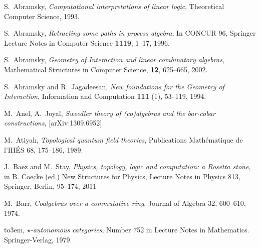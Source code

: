 \documentclass[english,letter paper,12pt,reqno]{article}
\theoremstyle{example}
\numberwithin{equation}{section}
\begin{document}


\providecommand{\bysame}{\leavevmode\hbox to3em{\hrulefill}\thinspace}
\providecommand{\href}[2]{#2}
\begin{thebibliography}{BHLS03}

S.~Abramsky, \textsl{Computational interpretations of linear logic}, Theoretical Computer Science, 1993.

S.~Abramsky, \textsl{Retracting some paths in process algebra}, In CONCUR 96, Springer Lecture Notes in Computer Science \textbf{1119}, 1--17, 1996.

S.~Abramsky, \textsl{Geometry of {I}nteraction and linear combinatory algebras}, Mathematical Structures in Computer Science, \textbf{12}, 625--665, 2002.

S.~Abramsky and R.~Jagadeesan, \textsl{New foundations for the {G}eometry of {I}nteraction}, Information and Computation \textbf{111} (1), 53--119, 1994.

M.~Anel, A.~Joyal, \textsl{Sweedler theory of (co)algebras and the bar-cobar constructions}, \href{http://arxiv.org/abs/1309.6952}{[arXiv:1309.6952]}

M.~Atiyah, \textsl{Topological quantum field theories}, Publications Math\'{e}matique de l'IH\'{E}S 68, 175--186, 1989.

J.~Baez and M.~Stay, \textsl{Physics, topology, logic and computation: a Rosetta stone}, in B. Coecke (ed.) New Structures for Physics, Lecture Notes in Physics 813, Springer, Berlin, 95--174, 2011

M.~Barr, \textsl{Coalgebras over a commutative ring}, Journal of Algebra 32, 600--610, 1974.

\bysame, \textsl{$\star$-autonomous categories}, Number 752 in Lecture Notes in Mathematics. Springer-Verlag, 1979.


\end{thebibliography}
\end{document}
